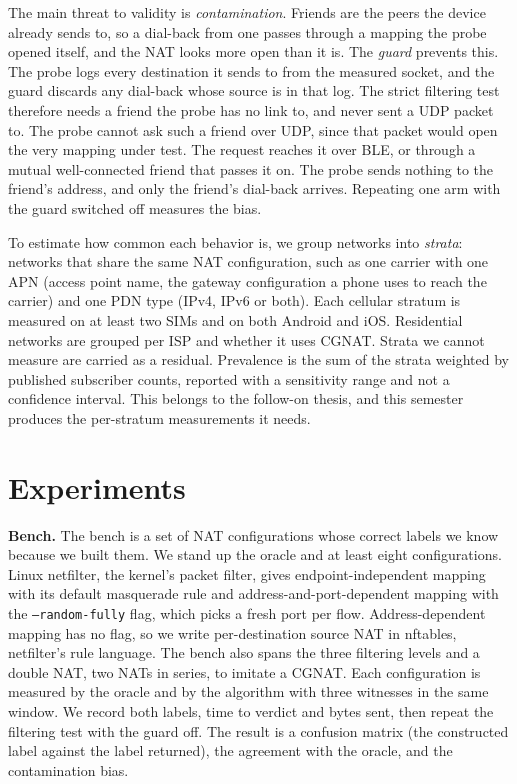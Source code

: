 \documentclass[11pt]{article}
\newcommand{\code}[1]{\texttt{\small #1}}
\begin{document}
The main threat to validity is \emph{contamination}. Friends are the peers the device already sends to, so a dial-back from one passes through a mapping the probe opened itself, and the NAT looks more open than it is. The \emph{guard} prevents this. The probe logs every destination it sends to from the measured socket, and the guard discards any dial-back whose source is in that log. The strict filtering test therefore needs a friend the probe has no link to, and never sent a UDP packet to. The probe cannot ask such a friend over UDP, since that packet would open the very mapping under test. The request reaches it over BLE, or through a mutual well-connected friend that passes it on. The probe sends nothing to the friend's address, and only the friend's dial-back arrives. Repeating one arm with the guard switched off measures the bias.

To estimate how common each behavior is, we group networks into \emph{strata}: networks that share the same NAT configuration, such as one carrier with one APN (access point name, the gateway configuration a phone uses to reach the carrier) and one PDN type (IPv4, IPv6 or both). Each cellular stratum is measured on at least two SIMs and on both Android and iOS. Residential networks are grouped per ISP and whether it uses CGNAT. Strata we cannot measure are carried as a residual. Prevalence is the sum of the strata weighted by published subscriber counts, reported with a sensitivity range and not a confidence interval. This belongs to the follow-on thesis, and this semester produces the per-stratum measurements it needs.

\section{Experiments}

\textbf{Bench.} The bench is a set of NAT configurations whose correct labels we know because we built them. We stand up the oracle and at least eight configurations. Linux netfilter, the kernel's packet filter, gives endpoint-independent mapping with its default masquerade rule and address-and-port-dependent mapping with the \code{--random-fully} flag, which picks a fresh port per flow. Address-dependent mapping has no flag, so we write per-destination source NAT in nftables, netfilter's rule language. The bench also spans the three filtering levels and a double NAT, two NATs in series, to imitate a CGNAT. Each configuration is measured by the oracle and by the algorithm with three witnesses in the same window. We record both labels, time to verdict and bytes sent, then repeat the filtering test with the guard off. The result is a confusion matrix (the constructed label against the label returned), the agreement with the oracle, and the contamination bias.
\end{document}

